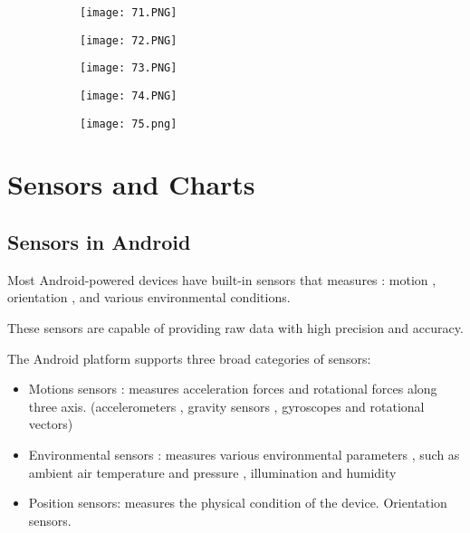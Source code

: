\documentclass{article}
\begin{document}
    \begin{figure}[ht!]
  \centering
  \begin{subfigure}[b]{1\linewidth}
  \texttt{[image: 71.PNG]}
  \end{subfigure}
  \end{figure}

    \begin{figure}[ht!]
  \centering
  \begin{subfigure}[b]{1\linewidth}
  \texttt{[image: 72.PNG]}
  \end{subfigure}
  \end{figure}

    \begin{figure}[ht!]
  \centering
  \begin{subfigure}[b]{1\linewidth}
  \texttt{[image: 73.PNG]}
  \end{subfigure}
  \end{figure}

   \begin{figure}[ht!]
  \centering
  \begin{subfigure}[b]{0.5\linewidth}
    \texttt{[image: 74.PNG]}
  \end{subfigure}
     \begin{subfigure}[b]{0.49\textwidth}
         \centering
         \texttt{[image: 75.png]}
     \end{subfigure}
\end{figure}

\vspace{40mm}

  \section{Sensors and Charts}

  \subsection{Sensors in Android}

  Most Android-powered devices have built-in sensors that measures : motion , orientation , and various environmental conditions.

  These sensors are capable of providing raw data with high precision and accuracy.

  The Android platform supports three broad categories of sensors:

  \begin{itemize}
      \item Motions sensors : measures acceleration forces and rotational forces along three axis. (accelerometers , gravity sensors , gyroscopes and rotational vectors)
      \item Environmental sensors : measures various environmental parameters , such as ambient air temperature and pressure , illumination and humidity
      \item Position sensors: measures the physical condition of the device. Orientation sensors.
  \end{itemize}
\end{document}
